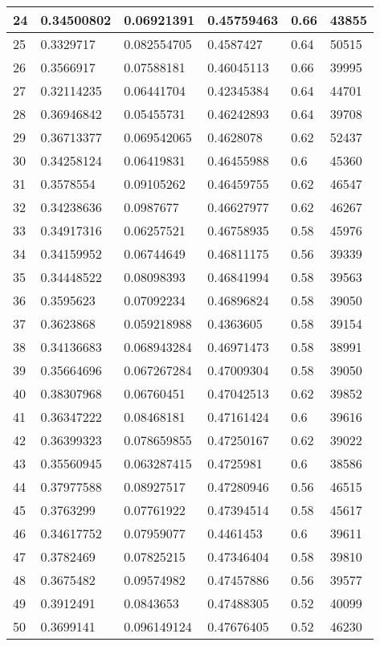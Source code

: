 \begin{longtable}{|l|l|l|l|l|l|}
24 & 0.34500802 & 0.06921391 & 0.45759463 & 0.66 & 43855 \\ \hline 
25 & 0.3329717 & 0.082554705 & 0.4587427 & 0.64 & 50515 \\ \hline 
26 & 0.3566917 & 0.07588181 & 0.46045113 & 0.66 & 39995 \\ \hline 
27 & 0.32114235 & 0.06441704 & 0.42345384 & 0.64 & 44701 \\ \hline 
28 & 0.36946842 & 0.05455731 & 0.46242893 & 0.64 & 39708 \\ \hline 
29 & 0.36713377 & 0.069542065 & 0.4628078 & 0.62 & 52437 \\ \hline 
30 & 0.34258124 & 0.06419831 & 0.46455988 & 0.6 & 45360 \\ \hline 
31 & 0.3578554 & 0.09105262 & 0.46459755 & 0.62 & 46547 \\ \hline 
32 & 0.34238636 & 0.0987677 & 0.46627977 & 0.62 & 46267 \\ \hline 
33 & 0.34917316 & 0.06257521 & 0.46758935 & 0.58 & 45976 \\ \hline 
34 & 0.34159952 & 0.06744649 & 0.46811175 & 0.56 & 39339 \\ \hline 
35 & 0.34448522 & 0.08098393 & 0.46841994 & 0.58 & 39563 \\ \hline 
36 & 0.3595623 & 0.07092234 & 0.46896824 & 0.58 & 39050 \\ \hline 
37 & 0.3623868 & 0.059218988 & 0.4363605 & 0.58 & 39154 \\ \hline 
38 & 0.34136683 & 0.068943284 & 0.46971473 & 0.58 & 38991 \\ \hline 
39 & 0.35664696 & 0.067267284 & 0.47009304 & 0.58 & 39050 \\ \hline 
40 & 0.38307968 & 0.06760451 & 0.47042513 & 0.62 & 39852 \\ \hline 
41 & 0.36347222 & 0.08468181 & 0.47161424 & 0.6 & 39616 \\ \hline 
42 & 0.36399323 & 0.078659855 & 0.47250167 & 0.62 & 39022 \\ \hline 
43 & 0.35560945 & 0.063287415 & 0.4725981 & 0.6 & 38586 \\ \hline 
44 & 0.37977588 & 0.08927517 & 0.47280946 & 0.56 & 46515 \\ \hline 
45 & 0.3763299 & 0.07761922 & 0.47394514 & 0.58 & 45617 \\ \hline 
46 & 0.34617752 & 0.07959077 & 0.4461453 & 0.6 & 39611 \\ \hline 
47 & 0.3782469 & 0.07825215 & 0.47346404 & 0.58 & 39810 \\ \hline 
48 & 0.3675482 & 0.09574982 & 0.47457886 & 0.56 & 39577 \\ \hline 
49 & 0.3912491 & 0.0843653 & 0.47488305 & 0.52 & 40099 \\ \hline 
50 & 0.3699141 & 0.096149124 & 0.47676405 & 0.52 & 46230 \\ \hline 
\end{longtable}